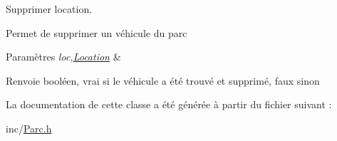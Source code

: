 Supprimer location. 

Permet de supprimer un véhicule du parc


\begin{DoxyParams}{Paramètres}
{\em loc,\hyperlink{class_location}{Location}} & \\
\hline
\end{DoxyParams}
\begin{DoxyReturn}{Renvoie}
booléen, vrai si le véhicule a été trouvé et supprimé, faux sinon 
\end{DoxyReturn}


La documentation de cette classe a été générée à partir du fichier suivant :\begin{DoxyCompactItemize}
\item 
inc/\hyperlink{_parc_8h}{Parc.h}\end{DoxyCompactItemize}
